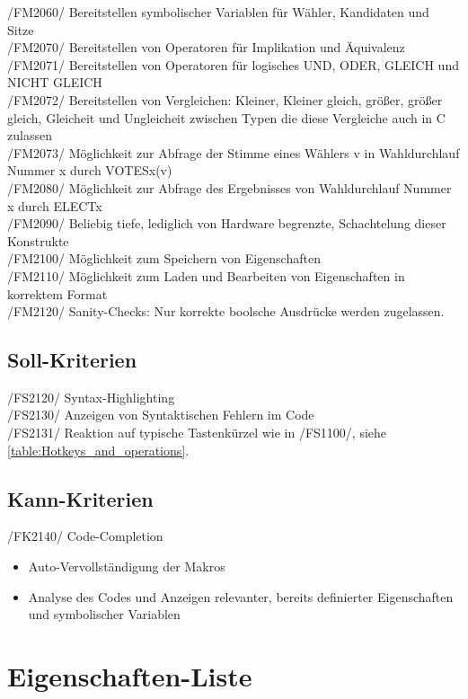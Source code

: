 \documentclass[a4paper]{scrreprt}
\begin{document}
/FM2060/ Bereitstellen symbolischer Variablen für Wähler, Kandidaten und Sitze \\
/FM2070/ Bereitstellen von Operatoren für Implikation und Äquivalenz \\
/FM2071/ Bereitstellen von Operatoren für logisches UND, ODER, GLEICH und NICHT GLEICH \\
/FM2072/ Bereitstellen von Vergleichen: Kleiner, Kleiner gleich, größer, größer gleich,  Gleicheit und Ungleicheit zwischen Typen die diese Vergleiche auch in C zulassen \\
/FM2073/ Möglichkeit zur Abfrage der Stimme eines Wählers v in Wahldurchlauf Nummer x durch VOTESx(v)\\
/FM2080/ Möglichkeit zur Abfrage des Ergebnisses von Wahldurchlauf Nummer x durch ELECTx \\
/FM2090/ Beliebig tiefe, lediglich von Hardware begrenzte, Schachtelung dieser Konstrukte \\
/FM2100/ Möglichkeit zum Speichern von Eigenschaften \\
/FM2110/ Möglichkeit zum Laden und Bearbeiten von Eigenschaften in korrektem Format \\
/FM2120/ Sanity-Checks: Nur korrekte boolsche Ausdrücke werden zugelassen.

\subsection{Soll-Kriterien}
/FS2120/ Syntax-Highlighting \\
/FS2130/ Anzeigen von Syntaktischen Fehlern im Code \\
/FS2131/ Reaktion auf typische Tastenkürzel wie in /FS1100/, siehe \ref{table:Hotkeys_and_operations}. \\


\subsection{Kann-Kriterien}
/FK2140/ Code-Completion
\begin{itemize}
\item Auto-Vervollständigung der Makros
\item Analyse des Codes und Anzeigen relevanter, bereits definierter Eigenschaften und symbolischer Variablen
\end{itemize}

\section{Eigenschaften-Liste}
\end{document}
